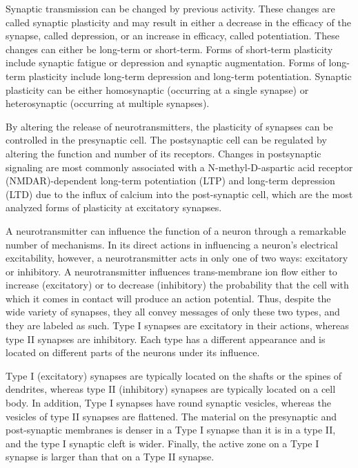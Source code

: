 Synaptic transmission can be changed by previous activity. These changes are called synaptic plasticity and may result in either a decrease in the efficacy of the synapse, called depression, or an increase in efficacy, called potentiation. These changes can either be long-term or short-term. Forms of short-term plasticity include synaptic fatigue or depression and synaptic augmentation. Forms of long-term plasticity include long-term depression and long-term potentiation. Synaptic plasticity can be either homosynaptic (occurring at a single synapse) or heterosynaptic (occurring at multiple synapses).

By altering the release of neurotransmitters, the plasticity of synapses can be controlled in the presynaptic cell. The postsynaptic cell can be regulated by altering the function and number of its receptors. Changes in postsynaptic signaling are most commonly associated with a N-methyl-D-aspartic acid receptor (NMDAR)-dependent long-term potentiation (LTP) and long-term depression (LTD) due to the influx of calcium into the post-synaptic cell, which are the most analyzed forms of plasticity at excitatory synapses.

A neurotransmitter can influence the function of a neuron through a remarkable number of mechanisms. In its direct actions in influencing a neuron's electrical excitability, however, a neurotransmitter acts in only one of two ways: excitatory or inhibitory. A neurotransmitter influences trans-membrane ion flow either to increase (excitatory) or to decrease (inhibitory) the probability that the cell with which it comes in contact will produce an action potential. Thus, despite the wide variety of synapses, they all convey messages of only these two types, and they are labeled as such. Type I synapses are excitatory in their actions, whereas type II synapses are inhibitory. Each type has a different appearance and is located on different parts of the neurons under its influence.

Type I (excitatory) synapses are typically located on the shafts or the spines of dendrites, whereas type II (inhibitory) synapses are typically located on a cell body. In addition, Type I synapses have round synaptic vesicles, whereas the vesicles of type II synapses are flattened. The material on the presynaptic and post-synaptic membranes is denser in a Type I synapse than it is in a type II, and the type I synaptic cleft is wider. Finally, the active zone on a Type I synapse is larger than that on a Type II synapse.

